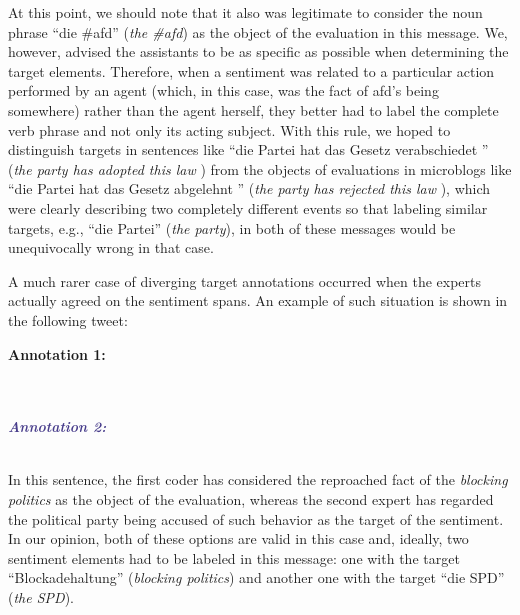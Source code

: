 At this point, we should note that it also was legitimate to consider
the noun phrase ``die \#afd'' (\emph{the \#afd}) as the object of the
evaluation in this message.  We, however, advised the assistants to be
as specific as possible when determining the target
elements. Therefore, when a sentiment was related to a particular
action performed by an agent (which, in this case, was the fact of
afd's being somewhere) rather than the agent herself, they better had
to label the complete verb phrase and not only its acting subject.
With this rule, we hoped to distinguish targets in sentences like
``die Partei hat das Gesetz verabschiedet \smiley{}'' (\emph{the party
  has adopted this law \smiley{}}) from the objects of evaluations in
microblogs like ``die Partei hat das Gesetz abgelehnt \smiley{}''
(\emph{the party has rejected this law \smiley{}}), which were clearly
describing two completely different events so that labeling similar
targets, e.g., ``die Partei'' (\emph{the party}), in both of these
messages would be unequivocally wrong in that case.

A much rarer case of diverging target annotations occurred when the
experts actually agreed on the sentiment spans.  An example of such
situation is shown in the following tweet:
\begin{example}\label{snt:exmp:targt-disagr}
  \textcolor{red3}{\textbf{Annotation
      1:}}\\
  \upshape{}\\[0.5em]
  \noindent\itshape{}\\[0.6em]\itshape

  \noindent\textcolor{darkslateblue}{\textbf{\itshape Annotation
      2:}}\\
  \upshape{}\\[0.5em]
  \noindent\itshape{}
\end{example}

In this sentence, the first coder has considered the reproached fact
of the \emph{blocking politics} as the object of the evaluation,
whereas the second expert has regarded the political party being
accused of such behavior as the target of the sentiment.  In our
opinion, both of these options are valid in this case and, ideally,
two sentiment elements had to be labeled in this message: one with the
target ``Blockadehaltung'' (\emph{blocking politics}) and another one
with the target ``die SPD'' (\emph{the SPD}).

